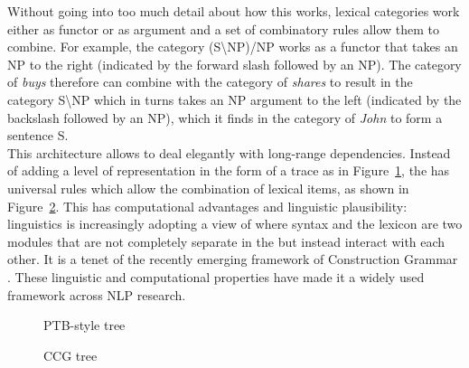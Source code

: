 \documentclass[output=paper]{langsci/langscibook}
\begin{document}
\indent Without going into too much detail about how this works, lexical categories work either as functor or as argument and a set of combinatory rules allow them to combine. For example, the category (S\textbackslash NP)/NP works as a functor that takes an NP to the right (indicated by the forward slash followed by an NP). The category of \textit{buys} therefore can combine with the category of \textit{shares} to result in the category S\textbackslash NP which in turns takes an NP argument to the left (indicated by the backslash followed by an NP), which it finds in the category of \textit{John} to form a sentence S.\\
\indent This  architecture allows  to deal elegantly with long-range dependencies. Instead of adding a level of representation in the form of a trace as in Figure~\ref{del:fig:3}, the  has universal rules which allow the combination of lexical items, as shown in Figure~\ref{del:fig:4}. This has computational advantages and linguistic plausibility: linguistics is increasingly adopting a view of  where syntax and the lexicon are two modules that are not completely separate in the  but instead interact with each other. It is a tenet of the recently emerging framework of Construction Grammar \citep{hoffmann2013}. These linguistic and computational properties have made it a widely used framework across NLP research.
\begin{figure}[h]
\caption{PTB-style tree\label{del:fig:3}}
\end{figure}

\begin{figure}[h]
\caption{CCG tree\label{del:fig:4}} 
\end{figure}
\end{document}
